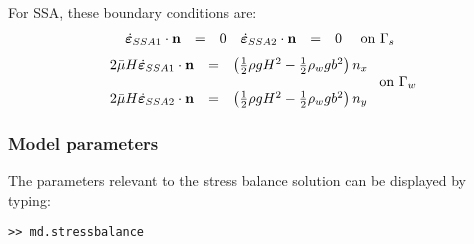 For SSA, these boundary conditions are:
\begin{equation}
	\begin{array}{rclrcll}
		\dot{\boldsymbol{\varepsilon}}_{SSA1} \cdot {\bf n} & = & 0 &
		\dot{\boldsymbol{\varepsilon}}_{SSA2} \cdot {\bf n} & = & 0 &
		\text{ on } \Gamma_s
	\end{array}
\end{equation}
\begin{equation}
	\begin{array}{rcl}
		2\bar{\mu}H\dot{\boldsymbol{\varepsilon}}_{SSA1} \cdot {\bf n} & = & \left(\frac{1}{2}\rho g H^2 - \frac{1}{2}\rho_w g b^2 \right) n_x \\
		\\
		2\bar{\mu}H\dot{\boldsymbol{\varepsilon}}_{SSA2} \cdot {\bf n} & = & \left(\frac{1}{2}\rho g H^2 - \frac{1}{2}\rho_w g b^2 \right) n_y
	\end{array}
	\text{ on } \Gamma_w
\end{equation}

\subsubsection{Model parameters}
The parameters relevant to the stress balance solution can be displayed by typing:
\begin{lstlisting}
>> md.stressbalance
\end{lstlisting}


